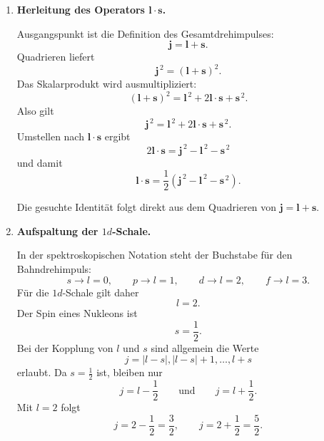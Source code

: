 \documentclass[11pt,a4paper]{scrartcl}
\newcommand{\abs}[1]{\left| #1 \right|}
\newcommand{\paren}[1]{\left( #1 \right)}
\newcommand{\vect}[1]{\bm{#1}}
\newcommand{\half}{\frac{1}{2}}
\theoremstyle{definition}
\theoremstyle{plain}
\theoremstyle{remark}
\begin{document}
\begin{enumerate}[label=(\alph*)]
    \item \textbf{Herleitung des Operators $\vect{l}\cdot\vect{s}$.}

    \begin{calculationbox}
        Ausgangspunkt ist die Definition des Gesamtdrehimpulses:
        \[
            \vect{j}=\vect{l}+\vect{s}.
        \]
        Quadrieren liefert
        \[
            \vect{j}^{\,2}
            =\paren{\vect{l}+\vect{s}}^2.
        \]
        Das Skalarprodukt wird ausmultipliziert:
        \[
            \paren{\vect{l}+\vect{s}}^2
            =\vect{l}^{\,2}+2\vect{l}\cdot\vect{s}+\vect{s}^{\,2}.
        \]
        Also gilt
        \[
            \vect{j}^{\,2}
            =\vect{l}^{\,2}+2\vect{l}\cdot\vect{s}+\vect{s}^{\,2}.
        \]
        Umstellen nach $\vect{l}\cdot\vect{s}$ ergibt
        \[
            2\vect{l}\cdot\vect{s}
            =\vect{j}^{\,2}-\vect{l}^{\,2}-\vect{s}^{\,2}
        \]
        und damit
        \[
            \boxed{\vect{l}\cdot\vect{s}
            =\half\paren{\vect{j}^{\,2}-\vect{l}^{\,2}-\vect{s}^{\,2}}}.
        \]
    \end{calculationbox}

    \begin{answerbox}
        Die gesuchte Identit\"at folgt direkt aus dem Quadrieren von $\vect{j}=\vect{l}+\vect{s}$.
    \end{answerbox}

    \item \textbf{Aufspaltung der $1d$-Schale.}

    \begin{calculationbox}
        In der spektroskopischen Notation steht der Buchstabe f\"ur den Bahndrehimpuls:
        \[
            s\to l=0,
            \qquad
            p\to l=1,
            \qquad
            d\to l=2,
            \qquad
            f\to l=3.
        \]
        F\"ur die $1d$-Schale gilt daher
        \[
            l=2.
        \]
        Der Spin eines Nukleons ist
        \[
            s=\half.
        \]
        Bei der Kopplung von $l$ und $s$ sind allgemein die Werte
        \[
            j=\abs{l-s},\abs{l-s}+1,\dots,l+s
        \]
        erlaubt. Da $s=\half$ ist, bleiben nur
        \[
            j=l-\half
            \qquad\text{und}\qquad
            j=l+\half.
        \]
        Mit $l=2$ folgt
        \[
            j=2-\half=\frac{3}{2},
            \qquad
            j=2+\half=\frac{5}{2}.
        \]
    \end{calculationbox}


\end{enumerate}
\end{document}
